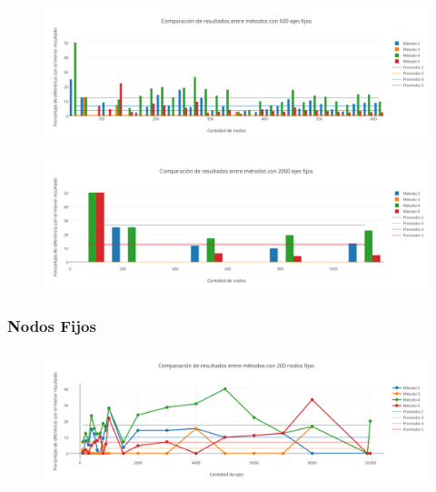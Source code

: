   \begin{figure}[h!]
   \begin{center}
 	\includegraphics[scale=0.55]{imagenes/local/resultados/500ejes.png}
   \end{center}
 \end{figure}
 
   \begin{figure}[h!]
   \begin{center}
 	\includegraphics[scale=0.55]{imagenes/local/resultados/2000ejes.png}
   \end{center}
 \end{figure}
 
  
\newpage  
  
\subsubsection*{Nodos Fijos}

  \begin{figure}[h!]
   \begin{center}
 	\includegraphics[scale=0.55]{imagenes/local/resultados/200nodos.png}
   \end{center}
 \end{figure}
 
